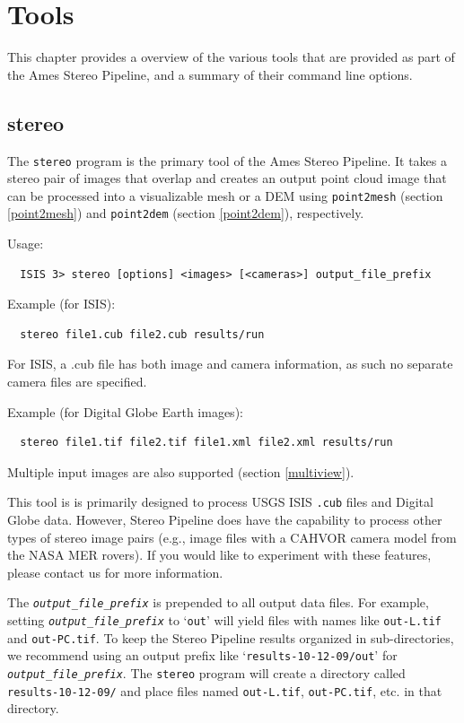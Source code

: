 \chapter{Tools}

This chapter provides a overview of the various tools that are
provided as part of the Ames Stereo Pipeline, and a summary of their
command line options.

\section{stereo}
\label{stereo}

The \texttt{stereo} program is the primary tool of the Ames Stereo
Pipeline. It takes a stereo pair of images that overlap and creates an
output point cloud image that can be processed into a visualizable mesh
or a DEM using \texttt{point2mesh} (section \ref{point2mesh}) and
\texttt{point2dem} (section \ref{point2dem}), respectively.

\medskip

Usage:
\begin{verbatim}
  ISIS 3> stereo [options] <images> [<cameras>] output_file_prefix
\end{verbatim}

Example (for ISIS):
\begin{verbatim}
  stereo file1.cub file2.cub results/run
\end{verbatim}
For ISIS, a .cub file has both image and camera information, as such
no separate camera files are specified.

Example (for Digital Globe Earth images):
\begin{verbatim}
  stereo file1.tif file2.tif file1.xml file2.xml results/run
\end{verbatim}

Multiple input images are also supported (section \ref{multiview}).

This tool is is primarily designed to process USGS ISIS \texttt{.cub}
files and Digital Globe data. However, Stereo Pipeline
does have the capability to process other types of stereo image pairs
(e.g., image files with a CAHVOR camera model from the NASA MER
rovers). If you would like to experiment with these features, please
contact us for more information.

The \texttt{\textit{output\_file\_prefix}} is prepended to all
output data files.  For example, setting \texttt{\textit{output\_file\_prefix}}
to `\texttt{out}' will yield files with names like \texttt{out-L.tif}
and \texttt{out-PC.tif}.  To keep the Stereo Pipeline results organized
in sub-directories, we recommend using an output prefix like
`\texttt{results-10-12-09/out}' for \texttt{\textit{output\_file\_prefix}}.  The
\texttt{stereo} program will create a directory called
\texttt{results-10-12-09/} and place files named \texttt{out-L.tif},
\texttt{out-PC.tif}, etc. in that directory.

